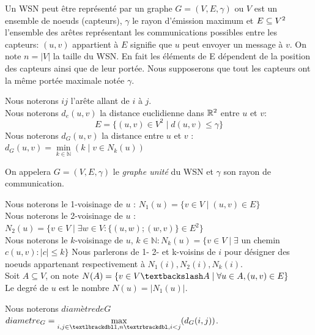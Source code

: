   Un WSN peut être représenté par un graphe $G= (V,E,\gamma)$ ou $V$ est un ensemble de noeuds (capteurs), $\gamma$ le rayon d'émission maximum et $E \subseteq V \textsuperscript{2}$ l'ensemble des arêtes représentant les communications possibles entre les capteurs: $(u,v)$ appartient à $E$ signifie que $u$ peut envoyer un  message à $v$. On note $ n=|V| $ la taille du WSN. En fait les éléments de E dépendent de la
 position des capteurs ainsi que de leur portée. Nous supposerons que tout les capteurs ont la même portée maximale notée $\gamma$. 


\begin{mydef}
Nous noterons $ij$ l'arête allant de $i$ à $j$. \\
Nous noterons $d_e(u,v)$ la distance euclidienne dans $\mathbb{R} \textsuperscript{2}$ entre $u$ et $v$:
$$E = \{ (u,v) \in V ^{2} \mid d(u,v) \leq \gamma \}$$
Nous noterons $d_G(u,v)$ la distance entre $ u $ et $ v $ : $d_G(u,v)= \min\limits_{k \in \mathbb{N}}(k \mid v \in N_k(u))$
\end{mydef}


\begin{mydef}
 On appelera $G= (V,E,\gamma)$ le \textit{graphe unité} du WSN et $\gamma$ son rayon de communication.
\end{mydef}



\begin{mydef}
Nous noterons le 1-voisinage de $u$ : $N_1(u) = \{ v \in V  \mid (u,v) \in E \}$ \\
Nous noterons le 2-voisinage de $u$ : $N_2(u) = \{ v \in V \mid  \exists w \in V :\{(u,w);(w,v)\} \in E ^2\}$ \\
Nous noterons le $k$-voisinage de $u$, $k \in \mathbb{N} : N_k(u) = \{ v \in V  \mid \exists $ un chemin $c (u,v): |c| \leq k\}$  Nous parlerons de 1- 2- et k-voisins de $i$ pour désigner des noeuds appartenant respectivement à $N_1(i), N_2(i),N_k(i)$. \\
Soit $A \subseteq V$, on note $N(A) = \{ v \in V\textbackslash  A \mid \forall u\in A,(u,v) \in E \}$ \\
Le degré de $ u $ est le nombre  $N(u)=|N_1(u)|$.\\
\end{mydef}

\begin{mydef}
Nous noterons $diamètre de G$ $diametre_G= \max\limits_{i,j\in \textlbrackdbl 1,n \textrbrackdbl,i<j} (d_G(i,j))$.
\end{mydef}
 

